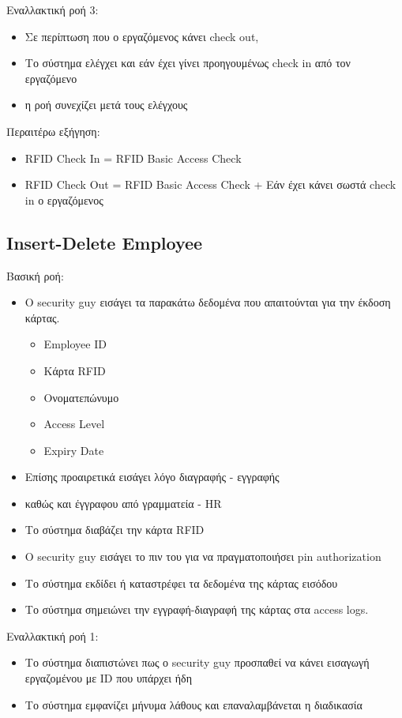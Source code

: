 \documentclass{article}
\begin{document}
\noindent Εναλλακτική ροή 3: 
\begin{itemize}
    \item Σε περίπτωση που ο εργαζόμενος κάνει check out,
    \item Το σύστημα ελέγχει και εάν έχει γίνει προηγουμένως check in από τον εργαζόμενο
    \item η ροή συνεχίζει μετά τους ελέγχους
\end{itemize}

\noindent Περαιτέρω εξήγηση:
\begin{itemize}
\item RFID Check In = RFID Basic Access Check
\item RFID Check Out = RFID Basic Access Check + Εάν έχει κάνει σωστά check in ο εργαζόμενος
\end{itemize}

\subsection{Insert-Delete Employee}

\noindent Βασική ροή:
\begin{itemize}
    \item Ο security guy εισάγει τα παρακάτω δεδομένα που απαιτούνται για την έκδοση κάρτας.
    \begin{itemize}
        \item Employee ID
        \item Κάρτα RFID
        \item Ονοματεπώνυμο
        \item Access Level
        \item Expiry Date
    \end{itemize}
    \item Επίσης προαιρετικά εισάγει λόγο διαγραφής - εγγραφής 
    \item καθώς και έγγραφου από γραμματεία - HR
    \item Το σύστημα διαβάζει την κάρτα RFID
    \item Ο security guy εισάγει το πιν του για να πραγματοποιήσει pin authorization
    \item Το σύστημα εκδίδει ή καταστρέφει τα δεδομένα της κάρτας εισόδου
    \item Το σύστημα σημειώνει την εγγραφή-διαγραφή της κάρτας στα access logs.
\end{itemize}

\noindent Εναλλακτική ροή 1: 
\begin{itemize}
    \item Το σύστημα διαπιστώνει πως ο security guy προσπαθεί να κάνει εισαγωγή εργαζομένου με ID που υπάρχει ήδη
    \item Το σύστημα εμφανίζει μήνυμα λάθους και επαναλαμβάνεται η διαδικασία
\end{itemize}
\end{document}
